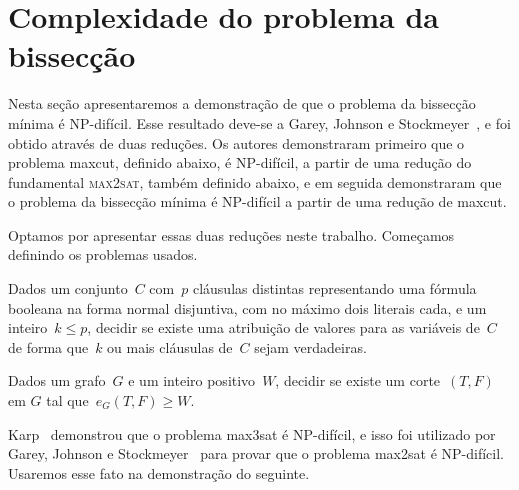 \section {Complexidade do problema da bissecção}

	Nesta seção apresentaremos a demonstração de que o problema 
	da bissecção mínima é NP-difícil.
	Esse resultado deve-se a Garey, Johnson e Stockmeyer~\cite{GareyJS76},
	e foi obtido através de duas reduções.
	Os autores demonstraram primeiro que o problema {\sc maxcut},
	definido abaixo, é NP-difícil, a partir de uma redução do
	fundamental \textsc {max2sat}, também definido abaixo, e em seguida
	demonstraram que o problema da bissecção mínima é NP-difícil
	a partir de uma redução de {\sc maxcut}.

	Optamos por apresentar essas duas reduções neste trabalho.
	Começamos definindo os problemas usados.



	\medskip

	\begin{prob}
		Dados um conjunto~$C$ com~$p$ cláusulas distintas 
		representando uma fórmula booleana
		na forma 
		normal disjuntiva, com no máximo
		dois literais cada, e um inteiro~${k\le p}$,
		decidir se existe uma atribuição de valores para as variáveis de~$C$ de forma
		que~$k$ ou mais cláusulas de~$C$ sejam verdadeiras.

	\end{prob}

	\medskip

	\begin{prob}
		Dados um grafo~${G}$
		e um inteiro positivo~${W}$, decidir se existe um
		corte~$(T,F)$ em $G$ tal 
		que~${e_G(T,F)\ge W}$.
		
	\end{prob}


	Karp~\cite{Kar72} demonstrou que o problema 
	{\sc max3sat} é NP-difícil,
	e isso foi utilizado por Garey, 
	Johnson e Stockmeyer~\cite{GareyJS76} 
	para provar que 
	o problema {\sc max2sat} é NP-difícil.
	Usaremos esse fato na demonstração do seguinte.


